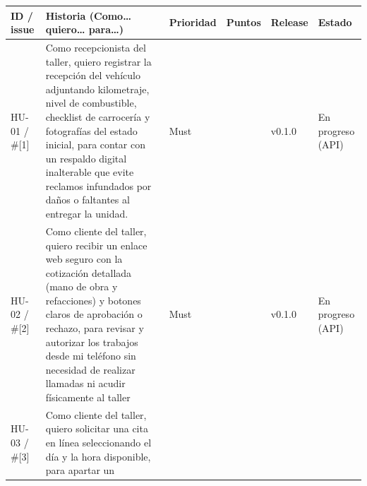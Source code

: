 {\def\LTcaptype{none} %
\begin{longtable}[]{@{}
  >{\raggedright\arraybackslash}p{}
  >{\raggedright\arraybackslash}p{}
  >{\raggedright\arraybackslash}p{}
  >{\raggedright\arraybackslash}p{}
  >{\raggedright\arraybackslash}p{}
  >{\raggedright\arraybackslash}p{}@{}}
\toprule\noalign{}
\begin{minipage}[b]{\linewidth}\raggedright
\textbf{ID / issue}
\end{minipage} & \begin{minipage}[b]{\linewidth}\raggedright
\textbf{Historia (Como\ldots{} quiero\ldots{} para\ldots)}
\end{minipage} & \begin{minipage}[b]{\linewidth}\raggedright
\textbf{Prioridad}
\end{minipage} & \begin{minipage}[b]{\linewidth}\raggedright
\textbf{Puntos}
\end{minipage} & \begin{minipage}[b]{\linewidth}\raggedright
\textbf{Release}
\end{minipage} & \begin{minipage}[b]{\linewidth}\raggedright
\textbf{Estado}
\end{minipage} \\
\midrule\noalign{}
\endhead
\bottomrule\noalign{}
\endlastfoot
HU-01 / \#{[}1{]} & Como recepcionista del taller, quiero registrar la
recepción del vehículo adjuntando kilometraje, nivel de combustible,
checklist de carrocería y fotografías del estado inicial, para contar
con un respaldo digital inalterable que evite reclamos infundados por
daños o faltantes al entregar la unidad. & Must & 3 & v0.1.0 &
En progreso (API) \\
HU-02 / \#{[}2{]} & Como cliente del taller, quiero recibir un enlace
web seguro con la cotización detallada (mano de obra y refacciones) y
botones claros de aprobación o rechazo, para revisar y autorizar los
trabajos desde mi teléfono sin necesidad de realizar llamadas ni acudir
físicamente al taller & Must & 3 & v0.1.0 & En progreso (API) \\
HU-03 / \#{[}3{]} & Como cliente del taller, quiero solicitar una cita
en línea seleccionando el día y la hora disponible, para apartar un

\end{longtable}}
